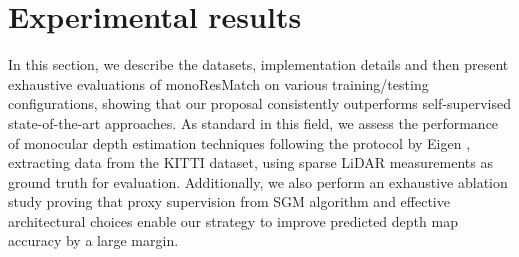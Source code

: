 \documentclass[10pt,twocolumn,letterpaper]{article}
\begin{document}
\section{Experimental results}\label{sec:experiments}

In this section, we describe the datasets, implementation details and then present exhaustive evaluations of monoResMatch on various training/testing configurations, showing that our proposal consistently outperforms self-supervised state-of-the-art approaches. As standard in this field, we assess the performance of monocular depth estimation techniques following the protocol by Eigen \etal \cite{eigen2014depth}, extracting data from the KITTI \cite{KITTI_RAW} dataset, using sparse LiDAR measurements as ground truth for evaluation. Additionally, we also perform an exhaustive ablation study proving that proxy supervision from SGM algorithm and effective architectural choices enable our strategy to improve predicted depth map accuracy by a large margin. 
\end{document}
